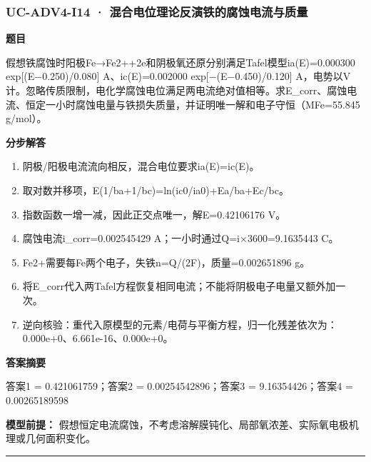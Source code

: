 \documentclass[UTF8,11pt,a4paper]{ctexart}
\begin{document}
\subsubsection*{UC-ADV4-I14 · 混合电位理论反演铁的腐蚀电流与质量}
\noindent\textbf{题目}\par
假想铁腐蚀时阳极Fe→Fe2++2e和阴极氧还原分别满足Tafel模型ia(E)=0.000300 exp[(E−0.250)/0.080] A、ic(E)=0.002000 exp[−(E−0.450)/0.120] A，电势以V计。忽略传质限制，电化学腐蚀电位满足两电流绝对值相等。求E\_corr、腐蚀电流、恒定一小时腐蚀电量与铁损失质量，并证明唯一解和电子守恒（MFe=55.845 g/mol）。\par
\medskip\noindent\textbf{分步解答}
\begin{enumerate}
\item 阴极/阳极电流流向相反，混合电位要求ia(E)=ic(E)。
\item 取对数并移项，E(1/ba+1/bc)=ln(ic0/ia0)+Ea/ba+Ec/bc。
\item 指数函数一增一减，因此正交点唯一，解E=0.42106176 V。
\item 腐蚀电流i\_corr=0.002545429 A；一小时通过Q=i×3600=9.1635443 C。
\item Fe2+需要每Fe两个电子，失铁n=Q/(2F)，质量=0.002651896 g。
\item 将E\_corr代入两Tafel方程恢复相同电流；不能将阴极电子电量又额外加一次。
\item 逆向核验：重代入原模型的元素/电荷与平衡方程，归一化残差依次为：0.000e+0、6.661e-16、0.000e+0。
\end{enumerate}
\noindent\textbf{答案摘要}\par
答案1 = 0.421061759；答案2 = 0.00254542896；答案3 = 9.16354426；答案4 = 0.00265189598\par
\noindent\textbf{模型前提：}
假想恒定电流腐蚀，不考虑溶解膜钝化、局部氧浓差、实际氧电极机理或几何面积变化。\par
\medskip\hrule\medskip
{}
\end{document}
